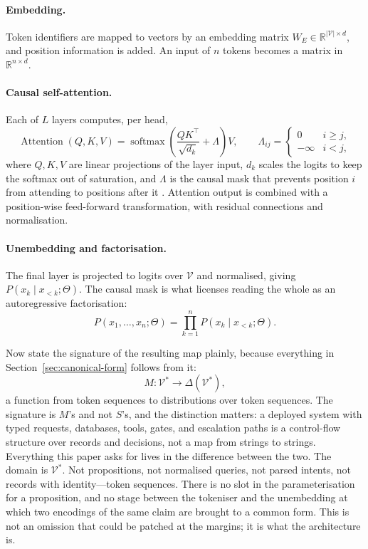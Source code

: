\paragraph{Embedding.} Token identifiers are mapped to vectors by an embedding
matrix $W_E \in \mathbb{R}^{|\mathcal{V}| \times d}$, and position information is
added. An input of $n$ tokens becomes a matrix in $\mathbb{R}^{n \times d}$.

\paragraph{Causal self-attention.} Each of $L$ layers computes, per head,
\begin{equation}
  \operatorname{Attention}(Q, K, V)
  = \operatorname{softmax}\!\left(\frac{QK^{\top}}{\sqrt{d_k}} + \Lambda\right) V,
  \qquad
  \Lambda_{ij} = \begin{cases} 0 & i \ge j,\\ -\infty & i < j,\end{cases}
  \label{eq:attention}
\end{equation}
where $Q, K, V$ are linear projections of the layer input, $d_k$ scales the logits
to keep the softmax out of saturation, and $\Lambda$ is the causal mask that
prevents position $i$ from attending to positions after it
\citep{vaswani2017}. Attention output is combined with a position-wise
feed-forward transformation, with residual connections and normalisation.

\paragraph{Unembedding and factorisation.} The final layer is projected to logits
over $\mathcal{V}$ and normalised, giving $P(x_k \mid x_{<k}; \Theta)$. The causal
mask is what licenses reading the whole as an autoregressive factorisation:
\begin{equation}
  P(x_1, \ldots, x_n; \Theta) = \prod_{k=1}^{n} P(x_k \mid x_{<k}; \Theta).
  \label{eq:factorisation}
\end{equation}

Now state the signature of the resulting map plainly, because everything in
Section~\ref{sec:canonical-form} follows from it:
\begin{equation}
  M : \mathcal{V}^{*} \longrightarrow \Delta(\mathcal{V}^{*}),
  \label{eq:signature}
\end{equation}
a function from token sequences to distributions over token sequences. The signature is
$M$'s and not $S$'s, and the distinction matters: a deployed system with typed requests,
databases, tools, gates, and escalation paths is a control-flow structure over records and
decisions, not a map from strings to strings. Everything this paper asks for lives in the
difference between the two. The domain
is $\mathcal{V}^{*}$. Not propositions, not normalised queries, not parsed
intents, not records with identity---token sequences. There is no slot in the
parameterisation for a proposition, and no stage between the tokeniser and the
unembedding at which two encodings of the same claim are brought to a common form.
This is not an omission that could be patched at the margins; it is what the
architecture is.

